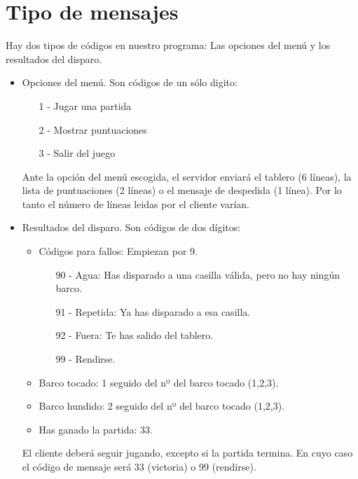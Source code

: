 \documentclass{article}
\begin{document}
\section{Tipo de mensajes}

Hay dos tipos de códigos en nuestro programa: Las opciones del menú y los resultados del disparo.

\begin{itemize}
  
\item Opciones del menú. Son códigos de un sólo digito:
  \begin{enumerate}
  \item[1 -] Jugar una partida
  \item[2 -] Mostrar puntuaciones
  \item[3 -] Salir del juego
  \end{enumerate}

  Ante la opción del menú escogida, el servidor enviará el tablero (6 líneas), la lista de puntuaciones (2 líneas) o el mensaje de despedida (1 línea). Por lo tanto el número de líneas leidas por el cliente varían.
  
\item Resultados del disparo. Son códigos de dos dígitos:
  \begin{itemize}
  \item Códigos para fallos: Empiezan por 9.
    \begin{enumerate}
    \item[90 -] Agua: Has disparado a una casilla válida, pero no hay ningún barco.
    \item[91 -] Repetida: Ya has disparado a esa casilla.
    \item[92 -] Fuera: Te has salido del tablero.
    \item[99 -] Rendirse.
    \end{enumerate}

  \item Barco tocado: 1 seguido del nº del barco tocado (1,2,3).
  \item Barco hundido: 2 seguido del nº del barco tocado (1,2,3).
  \item Has ganado la partida: 33.
  \end{itemize}

  El cliente deberá seguir jugando, excepto si la partida termina. En cuyo caso el código de mensaje será 33 (victoria) o 99 (rendirse).
  
\end{itemize}
\end{document}
